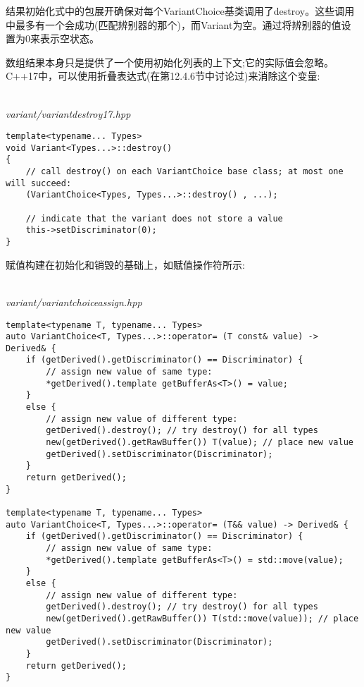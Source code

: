 结果初始化式中的包展开确保对每个VariantChoice基类调用了destroy。这些调用中最多有一个会成功(匹配辨别器的那个)，而Variant为空。通过将辨别器的值设置为0来表示空状态。

数组结果本身只是提供了一个使用初始化列表的上下文;它的实际值会忽略。C++17中，可以使用折叠表达式(在第12.4.6节中讨论过)来消除这个变量:

\hspace*{\fill} \\ %
\noindent
\textit{variant/variantdestroy17.hpp}
\begin{lstlisting}[style=styleCXX]
template<typename... Types>
void Variant<Types...>::destroy()
{
	// call destroy() on each VariantChoice base class; at most one will succeed:
	(VariantChoice<Types, Types...>::destroy() , ...);
	
	// indicate that the variant does not store a value
	this->setDiscriminator(0);
}
\end{lstlisting}



赋值构建在初始化和销毁的基础上，如赋值操作符所示:

\hspace*{\fill} \\ %
\noindent
\textit{variant/variantchoiceassign.hpp}
\begin{lstlisting}[style=styleCXX]
template<typename T, typename... Types>
auto VariantChoice<T, Types...>::operator= (T const& value) -> Derived& {
	if (getDerived().getDiscriminator() == Discriminator) {
		// assign new value of same type:
		*getDerived().template getBufferAs<T>() = value;
	}
	else {
		// assign new value of different type:
		getDerived().destroy(); // try destroy() for all types
		new(getDerived().getRawBuffer()) T(value); // place new value
		getDerived().setDiscriminator(Discriminator);
	}
	return getDerived();
}

template<typename T, typename... Types>
auto VariantChoice<T, Types...>::operator= (T&& value) -> Derived& {
	if (getDerived().getDiscriminator() == Discriminator) {
		// assign new value of same type:
		*getDerived().template getBufferAs<T>() = std::move(value);
	}
	else {
		// assign new value of different type:
		getDerived().destroy(); // try destroy() for all types
		new(getDerived().getRawBuffer()) T(std::move(value)); // place new value
		getDerived().setDiscriminator(Discriminator);
	}
	return getDerived();
}
\end{lstlisting}

